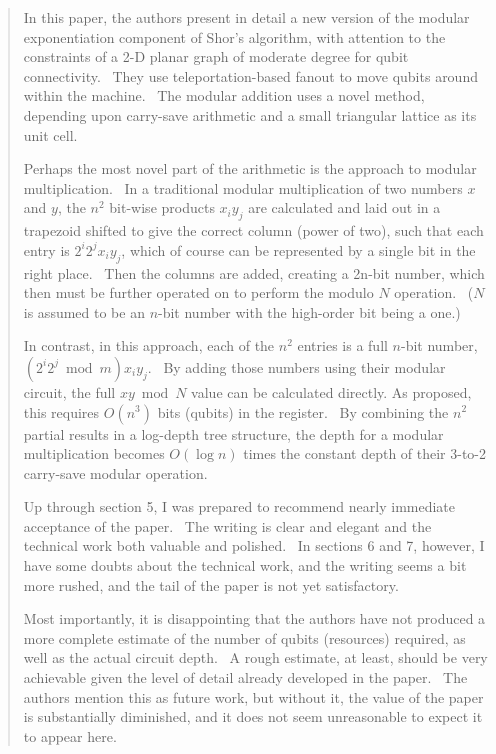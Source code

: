 \documentclass{article}
\theoremstyle{plain} \newtheorem{lemma}{Lemma}
\begin{document}
\begin{quote}
In this paper, the authors present in detail a new version of the 
modular exponentiation component of Shor's algorithm, with attention 
to the constraints of a 2-D planar graph of moderate degree for qubit 
connectivity.  They use teleportation-based fanout to move qubits 
around within the machine.  The modular addition uses a novel method, 
depending upon carry-save arithmetic and a small triangular lattice as 
its unit cell. 

Perhaps the most novel part of the arithmetic is the approach to 
modular multiplication.  In a traditional modular multiplication of 
two numbers $x$ and $y$, the $n^2$ bit-wise products $x_i y_j$ are calculated 
and laid out in a trapezoid shifted to give the correct column (power 
of two), such that each entry is $2^i 2^j x_i y_j$, which of course can 
be represented by a single bit in the right place.  Then the columns 
are added, creating a 2n-bit number, which then must be further 
operated on to perform the modulo $N$ operation.  ($N$ is assumed to be an 
$n$-bit number with the high-order bit being a one.) 

In contrast, in this approach, each of the $n^2$ entries is a full $n$-bit 
number, $(2^i 2^j \bmod m) x_i y_j$.  By adding those numbers using their 
modular circuit, the full $x y \bmod N$ value can be calculated directly. 
As proposed, this requires $O(n^3)$ bits (qubits) in the register.  By 
combining the $n^2$ partial results in a log-depth tree structure, the 
depth for a modular multiplication becomes $O(\log n)$ times the constant 
depth of their 3-to-2 carry-save modular operation. 

Up through section 5, I was prepared to recommend nearly immediate 
acceptance of the paper.  The writing is clear and elegant and the 
technical work both valuable and polished.  In sections 6 and 7, 
however, I have some doubts about the technical work, and the writing 
seems a bit more rushed, and the tail of the paper is not yet 
satisfactory.

Most importantly, it is disappointing that the authors have not 
produced a more complete estimate of the number of qubits (resources) 
required, as well as the actual circuit depth.  A rough estimate, at 
least, should be very achievable given the level of detail already 
developed in the paper.  The authors mention this as future work, but 
without it, the value of the paper is substantially diminished, and it 
does not seem unreasonable to expect it to appear here. 

\end{quote}
\end{document}

